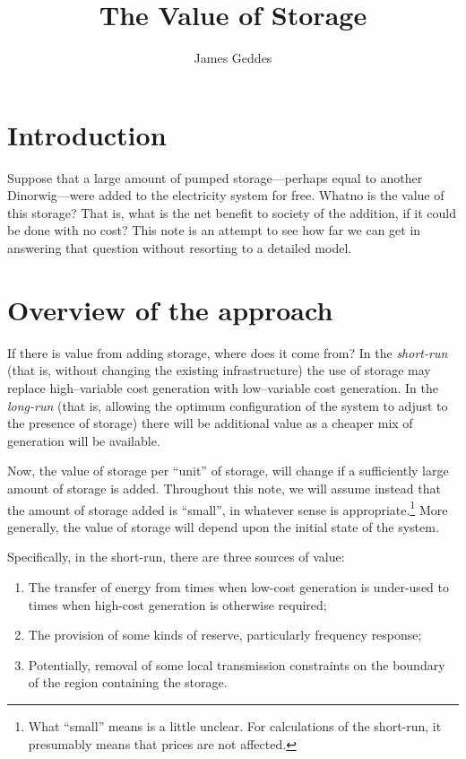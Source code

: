 \documentclass[12pt, a4paper]{article}
\title{The Value of Storage}
\author{James Geddes}
\begin{document}
\maketitle

\section{Introduction}
Suppose that a large amount of pumped storage—perhaps equal to another
Dinorwig—were added to the electricity system for free. Whatno
 is the
value of this storage? That is, what is the net benefit to society of
the addition, if it could be done with no cost? This note is an
attempt to see how far we can get in answering that question without
resorting to a detailed model.


\section{Overview of the approach}

If there is value from adding storage, where does it come from? In the
\emph{short-run} (that is, without changing the existing
infrastructure) the use of storage may replace high--variable cost
generation with low--variable cost generation. In the \emph{long-run}
(that is, allowing the optimum configuration of the system to adjust
to the presence of storage) there will be additional value as a
cheaper mix of generation will be available.

Now, the value of storage per ``unit'' of storage, will change if a
sufficiently large amount of storage is added. Throughout this note,
we will assume instead that the amount of storage added is ``small'',
in whatever sense is appropriate.\footnote{What ``small'' means is a
  little unclear. For calculations of the short-run, it presumably
  means that prices are not affected.} More generally, the value of
storage will depend upon the initial state of the system.

Specifically, in the short-run, there are three sources of value:
\begin{enumerate}
\item The transfer of energy from times when low-cost generation is
  under-used to times when high-cost generation is otherwise required;
\item The provision of some kinds of reserve, particularly frequency
  response;
\item Potentially, removal of some local transmission constraints on
  the boundary of the region containing the storage. 
\end{enumerate}
\end{document}
